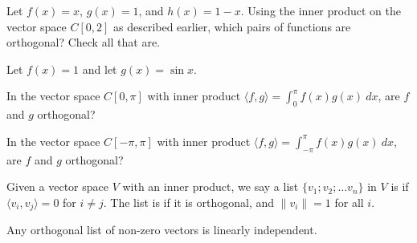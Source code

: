 \endedxproblem



Let $f(x) = x$, $g(x) = 1$, and $h(x) = 1-x$.  
Using the inner product on the vector space $C[0,2]$ as described earlier, 
which pairs of functions are orthogonal?  Check all that are.    



\endedxproblem



Let $f(x) = 1$ and let $g(x) = \sin x$.  

In the vector space $C[0,\pi]$ with inner product $\langle f,g\rangle = \int_0^{\pi} f(x)g(x) \ dx$,
are $f$ and $g$ orthogonal?   



In the vector space $C[-\pi,\pi]$ with inner product $\langle f,g\rangle = \int_{-\pi}^{\pi} f(x)g(x) \ dx$,
are $f$ and $g$ orthogonal?   



\endedxproblem



\endedxvertical







{} Given a vector space $V$ with an inner product, we say a list $\{v_1; v_2; \ldots v_n\}$ in  $V$ is {} if $\langle v_i,v_j\rangle = 0$ for $i\ne j$.  
The list is {} if it is orthogonal, and $\|v_i\| = 1$ for all $i$.  


{} Any orthogonal list of non-zero vectors is linearly independent.  

